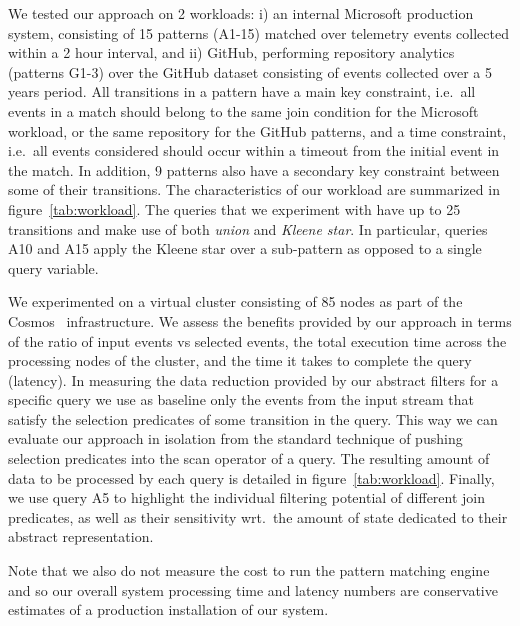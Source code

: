 We tested our approach on 2 workloads:
i) an internal Microsoft production system, consisting of 15 patterns (A1-15) matched over telemetry events
collected within a 2 hour interval, and 
ii) GitHub, performing repository analytics (patterns G1-3) over the GitHub
dataset consisting of events collected over a 5 years period.
All transitions in a pattern have a main key constraint, i.e.\ all events in a
match should belong to the same join condition for the Microsoft workload, or the same
repository for the GitHub patterns, and a time constraint, i.e.\ all events 
considered should occur within a timeout from the initial event in the match.
In addition, 9 patterns also have a secondary key constraint between some of
their transitions.
The characteristics of our workload are summarized in figure~\ref{tab:workload}.
The queries that we experiment with have up to 25 transitions and make use of
both {\em union} and {\em Kleene star}. 
In particular, queries A10 and A15 apply the Kleene star over a sub-pattern as
opposed to a single query variable.


We experimented on a virtual cluster consisting of 85 nodes as part of the 
Cosmos~\cite{Chaiken:2008} infrastructure.
We assess the benefits provided by our approach in terms of 
the ratio of input events vs selected events, 
the total execution time across the processing nodes of the cluster,
and the time it takes to complete the query (latency).
In measuring the data reduction provided by our abstract filters for a specific
query we use as baseline only the events from the input stream that satisfy the
selection predicates of some transition in the query. 
This way we can evaluate our approach in isolation from the standard technique
of pushing selection predicates into the scan operator of a query. 
The resulting amount of data to be processed by each query is detailed in
figure~\ref{tab:workload}.
Finally, we use query A5 to highlight the individual filtering potential
of different join predicates, as well as their sensitivity wrt.\ the amount of
state dedicated to their abstract representation.

Note that we also do not measure the cost to run the pattern matching engine and
so our overall system processing time and latency numbers are conservative
estimates of a production installation of our system.

